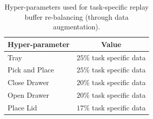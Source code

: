 \begin{table}[h!]
    \centering
    \begin{tabular}{L{4cm}|c}
    \hline
    \textbf{Hyper-parameter} & \textbf{Value} \\
    \hline
    Tray & $25 \%$ task specific data\\
    Pick and Place & $25 \%$ task specific data\\
    Close Drawer & $20 \%$ task specific data\\
    Open Drawer & $20 \%$ task specific data\\
    Place Lid & $17 \%$ task specific data\\
    \hline
    \end{tabular}
\caption{Hyper-parameters used for task-specific replay buffer re-balancing (through data augmentation).}
\label{table:task-data-hyperparams}
\end{table}

%